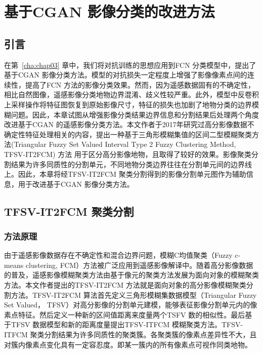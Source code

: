 
\chapter{基于CGAN 影像分类的改进方法}
\label{cha:chap04}

\section{引言}
\label{sec:chap04-1}
在第~\ref{cha:chap03} 章中，我们将对抗训练的思想应用到FCN 分类模型中，提出了基于CGAN 影像分类方法。模型的对抗损失一定程度上增强了影像像素点间的连续性，提高了FCN 方法的影像分类效果。然而，因为遥感数据固有的不确定性，相比自然图像，遥感影像分类地物边界混淆、歧义性较严重。此外，模型中反卷积上采样操作将特征图恢复到原始影像尺寸，特征的损失也加剧了地物分类的边界模糊问题。因此，本章试图从增强影像分类结果边界信息和分割结果后处理两个角度改进基于CGAN 的遥感影像分类方法。本文作者于2017年研究过高分影像数据不确定性特征处理相关的内容，提出一种基于三角形模糊集值的区间二型模糊聚类方法(Triangular Fuzzy Set Valued Interval Type 2 Fuzzy Clustering Method, TFSV-IT2FCM) 方法\cite{jiang2018enhanced} 用于区分高分影像地物，且取得了较好的效果。影像聚类分割结果为许多同质性的分割单元，不同地物分类边界往往在分割单元间的边界线上。因此，本章将经TFSV-IT2FCM 聚类分割得到的影像分割单元图作为辅助信息，用于改进基于CGAN 影像分类方法。


\section{TFSV-IT2FCM 聚类分割}
\label{sec:chap04-2}

\subsection{方法原理}
\label{subsec:chap04-2-1}
由于遥感影像数据存在不确定性和混合边界问题，模糊C均值聚类（Fuzzy c-means clustering, FCM）方法被广泛应用到遥感影像解译中\cite{bezdek1984fcm}。随着高分影像数据的普及，遥感影像模糊聚类方法由基于像元的聚类方法发展为面向对象的模糊聚类方法。本文作者提出的TFSV-IT2FCM 方法就是面向对象的高分影像模糊聚类分割方法。TFSV-IT2FCM 算法首先定义三角形模糊集数据模型（Triangular Fuzzy Set Valued， TFSV）对高分影像的分割单元建模，能够表征影像分割单元内的像素点特征。然后定义一种新的区间值距离来度量两个TSFV 数的相似性。最后基于TFSV 数据模型和新的距离度量提出TFSV-ITFCM 模糊聚类方法。TFSV-ITFCM 聚类分割结果为许多同质性的聚类簇。各聚类簇的像素点差异性不大，且对簇内像素点变化具有一定容忍度。即某一簇内的所有像素点可视作同类地物。

